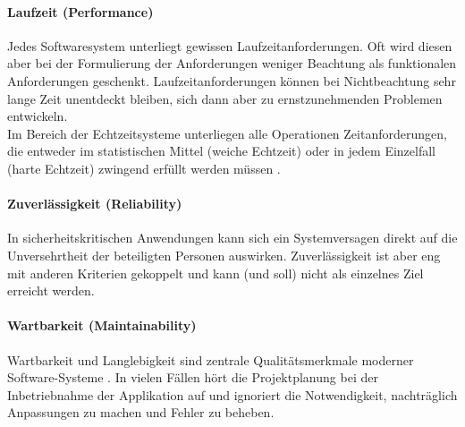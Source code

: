 \paragraph{Laufzeit (Performance)} Jedes Softwaresystem unterliegt gewissen Laufzeitanforderungen. Oft wird diesen aber bei der Formulierung der Anforderungen weniger Beachtung als funktionalen Anforderungen geschenkt. Laufzeitanforderungen können bei Nichtbeachtung sehr lange Zeit unentdeckt bleiben, sich dann aber zu ernstzunehmenden Problemen entwickeln.\\
Im Bereich der Echtzeitsysteme unterliegen alle Operationen Zeitanforderungen, die entweder im statistischen Mittel (weiche Echtzeit) oder in jedem Einzelfall (harte Echtzeit) zwingend erfüllt werden müssen \cite{hoffmann_software-qualitat_2013}. 

\paragraph{Zuverlässigkeit (Reliability)} In sicherheitskritischen Anwendungen kann sich ein Systemversagen direkt auf die Unversehrtheit der beteiligten Personen auswirken. Zuverlässigkeit ist aber eng mit anderen Kriterien gekoppelt und kann (und soll) nicht als einzelnes Ziel erreicht werden.

\paragraph{Wartbarkeit (Maintainability)} Wartbarkeit und Langlebigkeit sind zentrale Qualitätsmerkmale moderner Software-Systeme \cite{rombach_design_2009}. In vielen Fällen hört die Projektplanung bei der Inbetriebnahme der Applikation auf und ignoriert die Notwendigkeit, nachträglich Anpassungen zu machen und Fehler zu beheben.

